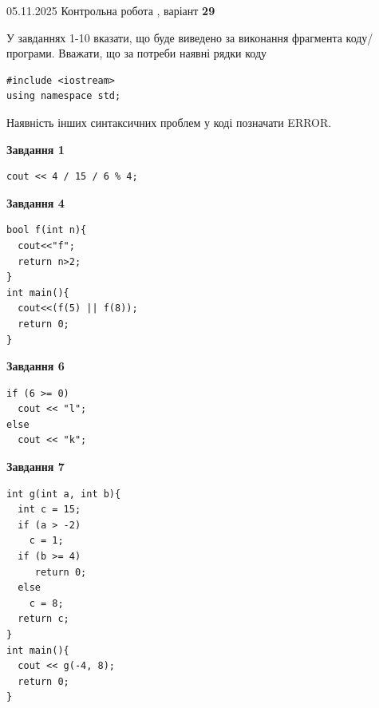 \documentclass[12pt, ukrainian]{article}
\begin{document}
\newpage

{\Large{05.11.2025 Контрольна робота , варіант  \No \textbf { 29 }\par}}
{
\begin {large}
У завданнях 1-10 вказати, що буде виведено за виконання фрагмента коду/про\-гра\-ми.
Вважати, що за потреби наявні рядки коду
\begin{verbatim}
#include <iostream>
using namespace std;
\end{verbatim}
Наявність інших синтаксичних проблем у коді позначати ERROR.

\begin{minipage}[t]{7.0cm}

\begin{center}
\textbf{Завдання 1}
\end{center}
\vspace{-8mm}

\begin{verbatim}
cout << 4 / 15 / 6 % 4;
\end{verbatim}



\begin{center}
\textbf{Завдання 4}
\end{center}
\vspace{-8mm}

\begin{verbatim}
bool f(int n){
  cout<<"f";
  return n>2;
}
int main(){
  cout<<(f(5) || f(8));
  return 0;
}
\end{verbatim}



\begin{center}
\textbf{Завдання 6}
\end{center}
\vspace{-8mm}

\begin{verbatim}
if (6 >= 0)
  cout << "l";
else
  cout << "k";
\end{verbatim}



\begin{center}
\textbf{Завдання 7}
\end{center}
\vspace{-8mm}

\begin{verbatim}
int g(int a, int b){
  int c = 15;
  if (a > -2)
    c = 1;
  if (b >= 4)
     return 0;
  else
    c = 8;
  return c;
}
int main(){
  cout << g(-4, 8);
  return 0;
}
\end{verbatim}


\end{minipage}
\end{large}}
\end{document}
